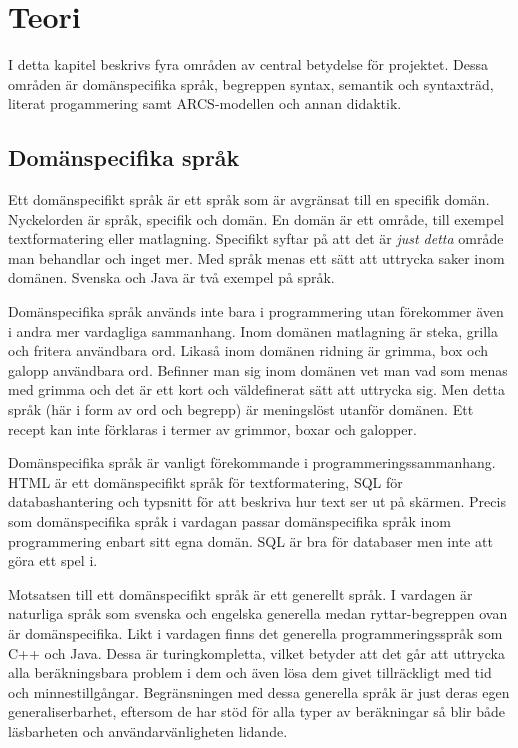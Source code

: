 
\chapter{Teori}

\begin{draft}

I detta kapitel beskrivs fyra områden av central betydelse för projektet. Dessa områden är domänspecifika språk, begreppen syntax, semantik och syntaxträd, literat progammering samt ARCS-modellen och annan didaktik.

\section{Domänspecifika språk}

Ett domänspecifikt språk är ett språk som är avgränsat till en specifik domän. Nyckelorden är språk, specifik och domän. En domän är ett område, till exempel textformatering eller matlagning. Specifikt syftar på att det är \textit{just detta} område man behandlar och inget mer. Med språk menas ett sätt att uttrycka saker inom domänen. Svenska och Java är två exempel på språk.

Domänspecifika språk används inte bara i programmering utan förekommer även i andra mer vardagliga sammanhang. Inom domänen matlagning är steka, grilla och fritera användbara ord. Likaså inom domänen ridning är grimma, box och galopp användbara ord. Befinner man sig inom domänen vet man vad som menas med grimma och det är ett kort och väldefinerat sätt att uttrycka sig. Men detta språk (här i form av ord och begrepp) är meningslöst utanför domänen. Ett recept kan inte förklaras i termer av grimmor, boxar och galopper.

Domänspecifika språk är vanligt förekommande i programmeringssammanhang. HTML är ett domänspecifikt språk för textformatering, SQL för databashantering och typsnitt för att beskriva hur text ser ut på skärmen. Precis som domänspecifika språk i vardagan passar domänspecifika språk inom programmering enbart sitt egna domän. SQL är bra för databaser men inte att göra ett spel i.

Motsatsen till ett domänspecifikt språk är ett generellt språk. I vardagen är naturliga språk som svenska och engelska generella medan ryttar-begreppen ovan är domänspecifika. Likt i vardagen finns det generella programmeringsspråk som C++ och Java. Dessa är turingkompletta, vilket betyder att det går att uttrycka alla beräkningsbara problem i dem och även lösa dem givet tillräckligt med tid och minnestillgångar.\cite{turing_ne} \cite{turing_book} Begränsningen med dessa generella språk är just deras egen generaliserbarhet, eftersom de har stöd för alla typer av beräkningar så blir både läsbarheten och användarvänligheten lidande.


\end{draft}
